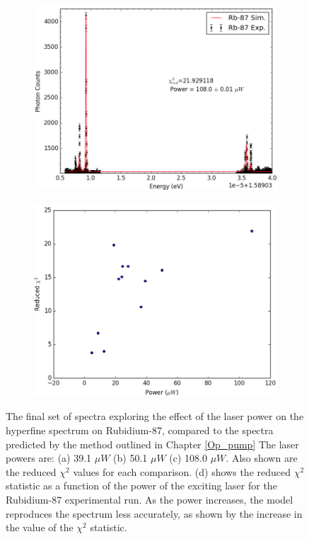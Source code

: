\begin{figure}[h]
    \begin{subfigure}[b]{0.49\textwidth}
        \includegraphics[width=\textwidth]{Graphics/117_118.png}
        \caption{}
        \label{}
    \end{subfigure}
    \begin{subfigure}[b]{0.49\textwidth}
        \includegraphics[width=\textwidth]{Graphics/chi-v-power.png}
        \caption{}
        \label{chi_vs_power}
    \end{subfigure}
    \caption[The final set of spectra exploring the effect of the laser power on the hyperfine spectrum on Rubidium-87.]{\small The final set of spectra exploring the effect of the laser power on the hyperfine spectrum on Rubidium-87, compared to the spectra predicted by the method outlined in Chapter \ref {Op_pump} The laser powers are: (a) 39.1 $\mu W$ (b) 50.1 $\mu W$ (c) 108.0 $\mu W$. Also shown are the reduced $\chi^2$ values for each comparison. (d) shows the reduced $\chi^2$ statistic as a function of the power of the exciting laser for the Rubidium-87 experimental run. As the power increases, the model reproduces the spectrum less accurately, as shown by the increase in the value of the $\chi^2$ statistic. }
\label{power39-108}
\end{figure}
